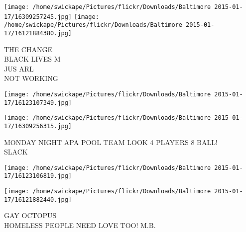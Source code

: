 \documentclass[10pt,letterpaper]{article}
\begin{document}
\texttt{[image: /home/swickape/Pictures/flickr/Downloads/Baltimore 2015-01-17/16309257245.jpg]}
\texttt{[image: /home/swickape/Pictures/flickr/Downloads/Baltimore 2015-01-17/16121884380.jpg]}

THE CHANGE\\
BLACK LIVES M\\
JUS ARL\\
NOT WORKING
\pagebreak

\texttt{[image: /home/swickape/Pictures/flickr/Downloads/Baltimore 2015-01-17/16123107349.jpg]}

\vspace{0.25in}
\texttt{[image: /home/swickape/Pictures/flickr/Downloads/Baltimore 2015-01-17/16309256315.jpg]}

MONDAY NIGHT APA POOL TEAM LOOK 4 PLAYERS 8 BALL!\\
SLACK
\pagebreak

\texttt{[image: /home/swickape/Pictures/flickr/Downloads/Baltimore 2015-01-17/16123106819.jpg]}

\vspace{0.25in}
\texttt{[image: /home/swickape/Pictures/flickr/Downloads/Baltimore 2015-01-17/16121882440.jpg]}

GAY OCTOPUS\\
HOMELESS PEOPLE NEED LOVE TOO!  M.B.
\pagebreak
\end{document}
